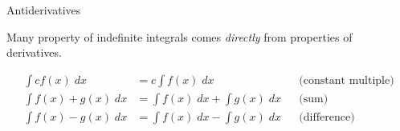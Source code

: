 \documentclass[../main.tex]{subfiles}
\begin{document}
\begin{lesson}{Antiderivatives}


  \clearpage
  Many property of indefinite integrals comes \emph{directly} from properties of derivatives.

  \begin{mdframed}[style=withref-compact]
    \begin{align*}
      \int c f(x) \;dx 
    &= c \int f(x) \;dx && \text{(constant multiple)}\\
    \int f(x) + g(x) \;dx 
    &= \int f(x) \;dx + \int g(x) \;dx && \text{(sum)}\\
    \int f(x) - g(x) \;dx 
    &= \int f(x) \;dx - \int g(x) \;dx && \text{(difference)}
    \end{align*}


\end{mdframed}
\end{lesson}
\end{document}
